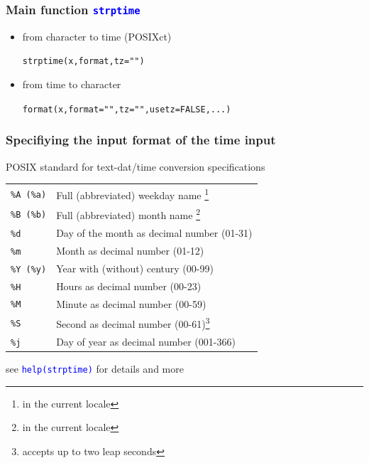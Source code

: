 \documentclass[xcolor=table, xcolor=dvipsnames]{beamer}\usepackage[]{graphicx}\usepackage[]{color}
\makeatletter
\newcommand{\hlnum}[1]{\textcolor[rgb]{0,0,0}{#1}}
\newcommand{\hlstr}[1]{\textcolor[rgb]{0.545,0.137,0.137}{#1}}
\newcommand{\hlstd}[1]{\textcolor[rgb]{0,0,0}{#1}}
\newcommand{\hlkwc}[1]{\textcolor[rgb]{1,0,1}{#1}}
\newcommand{\hlkwd}[1]{\textcolor[rgb]{0,0,1}{#1}}
\newenvironment{kframe}{%
 \def\at@end@of@kframe{}%
 \ifinner\ifhmode%
  \def\at@end@of@kframe{\end{minipage}}%
  \begin{minipage}{\columnwidth}%
 \fi\fi%
 \def\FrameCommand##1{\hskip\@totalleftmargin \hskip-\fboxsep
 \colorbox{shadecolor}{##1}\hskip-\fboxsep
     \hskip-\linewidth \hskip-\@totalleftmargin \hskip\columnwidth}%
 \MakeFramed {\advance\hsize-\width
   \@totalleftmargin\z@ \linewidth\hsize
   \@setminipage}}%
 {\par\unskip\endMakeFramed%
 \at@end@of@kframe}
\newenvironment{knitrout}{}{} %
\newcommand{\rcode}[1]{\texttt{\textcolor{Blue}{#1}}} %
\makeatother
\begin{document}

\begin{frame}\frametitle{Main function \rcode{strptime}}
\begin{itemize}
\item from character to time (POSIXct)
\begin{knitrout}
\color{fgcolor}\begin{kframe}
\begin{alltt}
\hlkwd{strptime}\hlstd{(x, format,} \hlkwc{tz} \hlstd{=} \hlstr{""}\hlstd{)}
\end{alltt}
\end{kframe}
\end{knitrout}
\item from time to character
\begin{knitrout}
\color{fgcolor}\begin{kframe}
\begin{alltt}
\hlkwd{format}\hlstd{(x,} \hlkwc{format} \hlstd{=} \hlstr{""}\hlstd{,} \hlkwc{tz} \hlstd{=} \hlstr{""}\hlstd{,} \hlkwc{usetz} \hlstd{=} \hlnum{FALSE}\hlstd{, ...)}
\end{alltt}
\end{kframe}
\end{knitrout}
\end{itemize}
\end{frame}


\begin{frame}\frametitle{Specifiying the input format of the time input}
\begin{block}{POSIX standard for text-dat/time conversion specifications}
\begin{tabular}{ll}
\texttt{\%A (\%a)} & Full (abbreviated) weekday name \footnote{in the current locale}\\
\texttt{\%B (\%b)} & Full (abbreviated) month name \footnote{in the current locale}\\
\texttt{\%d} & Day of the month as decimal number (01-31)\\
\texttt{\%m} & Month as decimal number (01-12)\\
\texttt{\%Y (\%y)} & Year with (without) century (00-99)\\
\texttt{\%H} & Hours as decimal number (00-23)\\
\texttt{\%M} & Minute as decimal number (00-59)\\
\texttt{\%S} & Second as decimal number (00-61)\footnote{accepts up to two leap seconds}\\
\texttt{\%j} & Day of year as decimal number (001-366)\\
\end{tabular}
\end{block}
see \rcode{help(strptime)} for details and more 
\end{frame}
\end{document}
